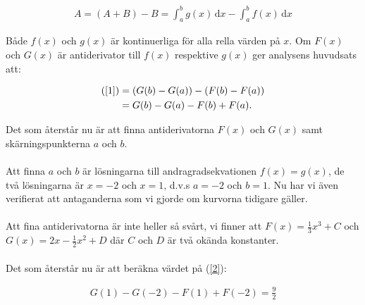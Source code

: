 \documentclass{article}
\begin{document}
\begin{gather}
  A = (A + B) - B = \int_{a}^{b} g(x) \,\mathrm{d}x - \int_{a}^{b} f(x) \,\mathrm{d}x \label{1}
\end{gather}

\noindent Både $f(x)$ och $g(x)$ är kontinuerliga för alla rella värden på $x$. Om $F(x)$ och $G(x)$ är antiderivator till $f(x)$ respektive $g(x)$ ger analysens huvudsats att:

\begin{align}
  \text{(\ref{1})} &= (G(b) - G(a)) - (F(b) - F(a)) \notag\\
  &= G(b) - G(a) - F(b) + F(a)\text{.} \label{2}
\end{align}

\noindent Det som återstår nu är att finna antiderivatorna $F(x)$ och $G(x)$ samt skärningspunkterna $a$ och $b$.
\\
\\
\noindent Att finna $a$ och $b$ är lösningarna till andragradsekvationen $f(x) = g(x)$, de två lösningarna är $x = -2$ och $x = 1$, d.v.s $a = -2$ och $b = 1$. Nu har vi även verifierat att antaganderna som vi gjorde om kurvorna tidigare gäller.
\\
\\
\noindent Att fina antiderivatorna är inte heller så svårt, vi finner att $F(x) =\tfrac{1}{3}x^{3} + C$ och $G(x) = 2x - \tfrac{1}{2}x^{2} + D$ där $C$ och $D$ är två okända konstanter.
\\
\\
\noindent Det som återstår nu är att beräkna värdet på (\ref{2}):

\begin{gather*}
  G(1) - G(-2) - F(1) + F(-2) = \frac{9}{2}
\end{gather*}

\centering{$\qed$}
\end{document}
